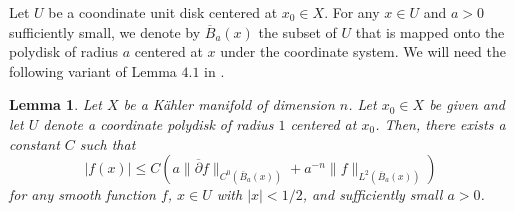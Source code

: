 \documentclass{amsart}
\newtheorem{lem}[thm]{Lemma}
\theoremstyle{definition}
\theoremstyle{remark}
\numberwithin{equation}{section}
\begin{document}
Let $U$ be a coondinate unit disk centered at $x_0 \in X$. For any $x \in U$ and $a > 0$ sufficiently small, we denote by $\overline{B}_{a}(x)$ the subset of $U$ that is mapped onto the polydisk of radius $a$ centered at $x$ under the coordinate system. We will need the following variant of Lemma $4.1$ in \cite {RT}.

\begin{lem} \label{lem: standard estimate}
Let $X$ be a K\"ahler manifold of dimension $n$. Let $x_0 \in X$ be given and let $U$ denote a coordinate polydisk of radius $1$ centered at $x_0$. Then, there exists a constant $C$ such that 
$$
|f(x)| \leq C(a\|\overline{\partial}f\|_{C^0(\overline{B}_a(x))} + a^{-n}\|f\|_{L^2(\overline{B}_a(x))})
$$
for any smooth function $f$, $x \in U$ with $|x| < 1/2$, and sufficiently small $a > 0$.
\end{lem}
\end{document}
